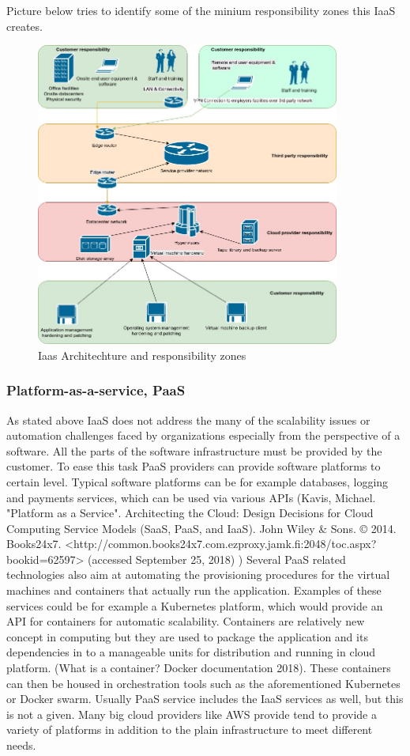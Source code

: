 \documentclass{article}
\begin{document}
Picture below tries to identify some of the minium responsibility zones this IaaS creates.
\begin{figure}
    \includegraphics[width=10cm,height=10cm]{thesis_iaas.jpg}
    \caption{Iaas Architechture and responsibility zones}
    \label{Figure:IaaS architechture}
\end{figure}
\subsubsection{Platform-as-a-service, PaaS}
As stated above IaaS does not address the many of the scalability issues or automation challenges faced by organizations especially from the perspective of a software. All the parts of the software infrastructure must be provided by the customer. To ease this task PaaS providers can provide software platforms to certain level. Typical software platforms can be for example databases, logging and payments services, which can be used via various APIs (Kavis, Michael. "Platform as a Service". Architecting the Cloud: Design Decisions for Cloud Computing Service Models (SaaS, PaaS, and IaaS). John Wiley \& Sons. © 2014. Books24x7. <http://common.books24x7.com.ezproxy.jamk.fi:2048/toc.aspx?bookid=62597> (accessed September 25, 2018) )
Several PaaS related technologies also aim at automating the provisioning procedures for the virtual machines and containers that actually run the application. Examples of these services could be for example a Kubernetes platform, which would provide an API for containers for automatic scalability. Containers are relatively new concept in computing but they are used to package the application and its dependencies in to a manageable units for distribution and running in cloud platform. (What is a container? Docker documentation 2018). These containers can then be housed in orchestration tools such as the aforementioned Kubernetes or Docker swarm. 
Usually PaaS service includes the IaaS services as well, but this is not a given. Many big cloud providers like AWS provide tend to provide a variety of platforms in addition to the plain infrastructure to meet different needs.
\end{document}
